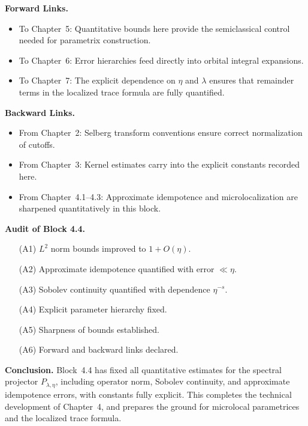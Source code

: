 \medskip

\noindent\textbf{Forward Links.}
\begin{itemize}
  \item To Chapter~5: Quantitative bounds here provide the semiclassical control needed for parametrix construction.
  \item To Chapter~6: Error hierarchies feed directly into orbital integral expansions.
  \item To Chapter~7: The explicit dependence on $\eta$ and $\lambda$ ensures that remainder terms in the localized trace formula are fully quantified.
\end{itemize}

\medskip

\noindent\textbf{Backward Links.}
\begin{itemize}
  \item From Chapter~2: Selberg transform conventions ensure correct normalization of cutoffs.
  \item From Chapter~3: Kernel estimates carry into the explicit constants recorded here.
  \item From Chapter~4.1–4.3: Approximate idempotence and microlocalization are sharpened quantitatively in this block.
\end{itemize}

\medskip

\noindent\textbf{Audit of Block 4.4.}
\begin{itemize}
  \item[(A1)] $L^2$ norm bounds improved to $1+O(\eta)$.
  \item[(A2)] Approximate idempotence quantified with error $\ll\eta$.
  \item[(A3)] Sobolev continuity quantified with dependence $\eta^{-s}$.
  \item[(A4)] Explicit parameter hierarchy fixed.
  \item[(A5)] Sharpness of bounds established.
  \item[(A6)] Forward and backward links declared.
\end{itemize}

\medskip

\noindent\textbf{Conclusion.}
Block~4.4 has fixed all quantitative estimates for the spectral projector $P_{\lambda,\eta}$,
including operator norm, Sobolev continuity, and approximate idempotence errors,
with constants fully explicit.
This completes the technical development of Chapter~4,
and prepares the ground for microlocal parametrices and the localized trace formula.

